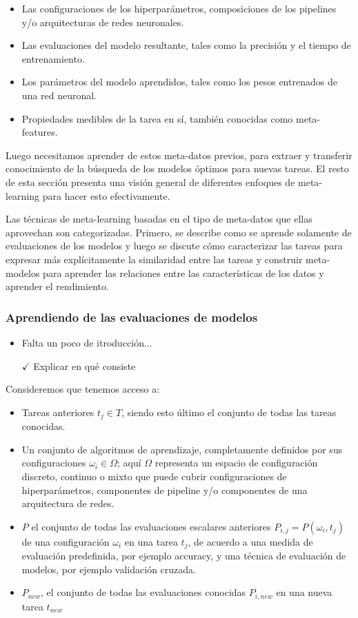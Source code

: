 \begin{itemize}
	\item Las configuraciones de los hiperparámetros, composiciones de los pipelines y/o arquitecturas de redes neuronales.
	\item Las evaluaciones del modelo resultante, tales como la precisión y el tiempo de entrenamiento.
	\item Los parámetros del modelo aprendidos, tales como los pesos entrenados de una red neuronal.
	\item Propiedades medibles de la tarea en sí, también conocidas como meta-features.
\end{itemize}

Luego necesitamos aprender de estos meta-datos previos, para extraer y transferir conocimiento de la búsqueda de los modelos óptimos para nuevas tareas. El resto de esta sección presenta una visión general de diferentes enfoques de meta-learning para hacer esto efectivamente.

Las técnicas de meta-learning basadas en el tipo de meta-datos que ellas aprovechan son categorizadas. Primero, se describe como se aprende solamente de evaluaciones de los modelos y luego se discute cómo caracterizar las tareas para expresar más explícitamente la similaridad entre las tareas y construir meta-modelos para aprender las relaciones entre las características de los datos y aprender el rendimiento.

\subsubsection{Aprendiendo de las evaluaciones de modelos}

\begin{itemize}
	\item Falta un poco de itroducción...
	\item[$\checkmark$] Explicar en qué consiste
\end{itemize}

Consideremos que tenemos acceso a:
\begin{itemize}
	\item Tareas anteriores $t_j \in T$, siendo esto último el conjunto de todas las tareas conocidas.
	\item Un conjunto de algoritmos de aprendizaje, completamente definidos por sus configuraciones $\omega_i \in \Omega$; aquí $\Omega$ representa un espacio de configuración discreto, continuo o mixto que puede cubrir configuraciones de hiperparámetros, componentes de pipeline y/o componentes de una arquitectura de redes.
	\item $P$ el conjunto de todas las evaluaciones escalares anteriores $P_{i,j} = P(\omega_i, t_j)$ de una configuración $\omega_i$ en una tarea $t_j$, de acuerdo a una medida de evaluación predefinida, por ejemplo accuracy, y una técnica de evaluación de modelos, por ejemplo validación cruzada. 
	\item $P_{new}$, el conjunto de todas las evaluaciones conocidas $P_{i, new}$ en una nueva tarea $t_{new}$ 
\end{itemize}

